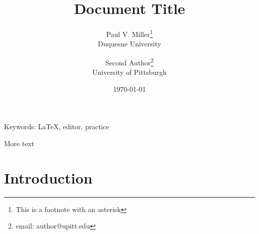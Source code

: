 \documentclass[11pt]{article}
\title{Document Title}
\author{Paul V. Miller\thanks{This is a footnote with an asterisk}\\Duquesne University \and Second Author\thanks{email: author@upitt.edu}\\University of Pittsburgh}
\date{\today}
\begin{document}
\maketitle

\begin{abstract}
    \lipsum[7]
\end{abstract}

Keywords: LaTeX, editor, practice

More text


\section{Introduction}

\lipsum[1-6]
\end{document}
